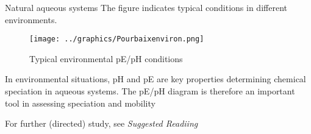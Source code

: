 \documentclass[a4paper,titlepage]{article}
\begin{document}
\begin{frame}{Natural aqueous systems}
The figure indicates typical conditions in different
environments.

\begin{figure}
\centering
\texttt{[image: ../graphics/Pourbaixenviron.png]} \label{envcon}
\caption{Typical environmental pE/pH conditions}
\end{figure}

In environmental situations, pH and pE are key properties determining
chemical speciation in aqueous systems. The pE/pH diagram is therefore
an important tool in assessing speciation and mobility

For further (directed) study, see \textit{Suggested Readiing}
\end{frame}
\end{document}
